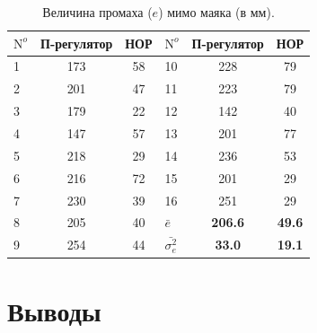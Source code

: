 \begin{table}
\caption{Величина промаха ($e$) мимо маяка (в мм).}\label{tabl:moby_pc_noc_cmp}
\centering
\begin{tabular}{|l|c|c||l|c|c|}
\hline
$\mathrm{N}^o$ & П-регулятор & НОР & $\mathrm{N}^o$ & П-регулятор & НОР \\
\hline
1&	173&	58& 10&	228&	79\\
2&	201&	47& 11&	223&	79\\
3&	179&	22& 12&	142&	40\\
4&	147&	57& 13&	201&	77\\
5&	218&	29& 14&	236&	53\\
6&	216&	72& 15&	201&	29\\
7&	230&	39& 16&	251&	29\\
\cline{4-6}
8&	205&	40& $\bar e$ & {\bf 206.6}&	{\bf 49.6}\\
9&	254&	44& $\bar{\sigma^2_e}$& {\bf 33.0} &	{\bf 19.1}\\
\hline
\end{tabular}
\end{table}

\section{Выводы}

